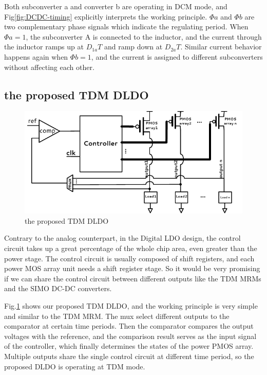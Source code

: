 \documentclass[draftcls, journal]{IEEEtran}
\begin{document}
Both subconverter a and converter b are operating in DCM mode, and Fig\ref{fig:DCDC-timing} explicitly interprets the working principle. $\Phi a$ and $\Phi b$ are two complementary phase signals which indicate the regulating period. When $\Phi a = 1$, the subconverter A is connected to the inductor, and the current through the inductor ramps up at $D_{1a}T$ and ramp down at $D_{2a}T$. Similar current behavior happens again when $\Phi b =1$, and the current is assigned to different subconverters without affecting each other. 

\subsection{the proposed TDM DLDO}
\begin{figure}[t!]
    \centering
    \includegraphics[width=\linewidth]{pic/TDM/TDMDLDO.pdf}
    \caption{the proposed TDM DLDO}
    \label{fig:TDMDLDO}
\end{figure}
Contrary to the analog counterpart, in the Digital LDO design, the control circuit takes up a great percentage of the whole chip area, even greater than the power stage. The control circuit is usually composed of shift registers, and each power MOS array unit needs a shift register stage. So it would be very promising if we can share the control circuit between different outputs like the TDM MRMs and the SIMO DC-DC converters.

Fig.\ref{fig:TDMDLDO} shows our proposed TDM DLDO, and the working principle is very simple and similar to the TDM MRM. The mux select different outputs to the comparator at certain time periods. Then the comparator compares the output voltages with the reference, and the comparison result serves as the input signal of the controller, which finally determines the states of the power PMOS array. Multiple outputs share the single control circuit at different time period, so the proposed DLDO is operating at TDM mode.
\end{document}
